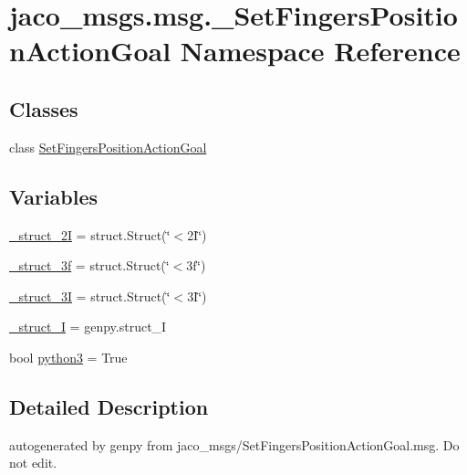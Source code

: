 \hypertarget{namespacejaco__msgs_1_1msg_1_1__SetFingersPositionActionGoal}{}\section{jaco\+\_\+msgs.\+msg.\+\_\+\+Set\+Fingers\+Position\+Action\+Goal Namespace Reference}
\label{namespacejaco__msgs_1_1msg_1_1__SetFingersPositionActionGoal}
\subsection*{Classes}
\begin{DoxyCompactItemize}
\item 
class \hyperlink{classjaco__msgs_1_1msg_1_1__SetFingersPositionActionGoal_1_1SetFingersPositionActionGoal}{Set\+Fingers\+Position\+Action\+Goal}
\end{DoxyCompactItemize}
\subsection*{Variables}
\begin{DoxyCompactItemize}
\item 
\hyperlink{namespacejaco__msgs_1_1msg_1_1__SetFingersPositionActionGoal_abd4f78a096e56d5d15694d791068c113}{\+\_\+struct\+\_\+2I} = struct.\+Struct(\char`\"{}$<$2\+I\char`\"{})
\item 
\hyperlink{namespacejaco__msgs_1_1msg_1_1__SetFingersPositionActionGoal_a812fc91f03b8a7495e307ef188ac4c89}{\+\_\+struct\+\_\+3f} = struct.\+Struct(\char`\"{}$<$3f\char`\"{})
\item 
\hyperlink{namespacejaco__msgs_1_1msg_1_1__SetFingersPositionActionGoal_a3eee8c8626f970a2e16712a6bbaa56c5}{\+\_\+struct\+\_\+3I} = struct.\+Struct(\char`\"{}$<$3\+I\char`\"{})
\item 
\hyperlink{namespacejaco__msgs_1_1msg_1_1__SetFingersPositionActionGoal_a775d9cc5e9af6817bffeabf2a2cfba5c}{\+\_\+struct\+\_\+I} = genpy.\+struct\+\_\+I
\item 
bool \hyperlink{namespacejaco__msgs_1_1msg_1_1__SetFingersPositionActionGoal_abaedf9bc415e7e7b7f17c36b99b4a33b}{python3} = True
\end{DoxyCompactItemize}


\subsection{Detailed Description}
\begin{DoxyVerb}autogenerated by genpy from jaco_msgs/SetFingersPositionActionGoal.msg. Do not edit.\end{DoxyVerb}
 

